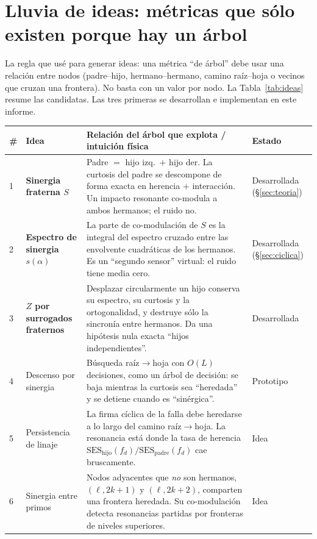 \documentclass[11pt,a4paper]{article}
\theoremstyle{definition}
\theoremstyle{remark}
\begin{document}
\section{Lluvia de ideas: métricas que sólo existen porque hay un árbol}
La regla que usé para generar ideas: una métrica ``de árbol'' debe usar una relación entre nodos (padre--hijo, hermano--hermano, camino raíz--hoja o vecinos que cruzan una frontera). No basta con un valor por nodo. La Tabla~\ref{tab:ideas} resume las candidatas. Las tres primeras se desarrollan e implementan en este informe.

\begin{table}[!htb]
\centering\small
\begin{tabularx}{\textwidth}{@{}p{0.3cm}p{3.6cm}Xp{2.1cm}@{}}
\toprule
\# & Idea & Relación del árbol que explota / intuición física & Estado \\
\midrule
1 & \textbf{Sinergia fraterna $S$} & Padre $=$ hijo izq.\ $+$ hijo der. La curtosis del padre se descompone de forma exacta en herencia $+$ interacción. Un impacto resonante co-modula a ambos hermanos; el ruido no. & Desarrollada (§\ref{sec:teoria}) \\
2 & \textbf{Espectro de sinergia $s(\alpha)$} & La parte de co-modulación de $S$ es la integral del espectro cruzado entre las envolvente cuadráticas de los hermanos. Es un ``segundo sensor'' virtual: el ruido tiene media cero. & Desarrollada (§\ref{sec:ciclica}) \\
3 & \textbf{$Z$ por surrogados fraternos} & Desplazar circularmente un hijo conserva su espectro, su curtosis y la ortogonalidad, y destruye sólo la sincronía entre hermanos. Da una hipótesis nula exacta ``hijos independientes''. & Desarrollada \\
4 & Descenso por sinergia & Búsqueda raíz$\to$hoja con $O(L)$ decisiones, como un árbol de decisión: se baja mientras la curtosis sea ``heredada'' y se detiene cuando es ``sinérgica''. & Prototipo \\
5 & Persistencia de linaje & La firma cíclica de la falla debe heredarse a lo largo del camino raíz$\to$hoja. La resonancia está donde la tasa de herencia $\mathrm{SES}_{\text{hijo}}(f_d)/\mathrm{SES}_{\text{padre}}(f_d)$ cae bruscamente. & Idea \\
6 & Sinergia entre primos & Nodos adyacentes que \emph{no} son hermanos, $(\ell,2k{+}1)$ y $(\ell,2k{+}2)$, comparten una frontera heredada. Su co-modulación detecta resonancias partidas por fronteras de niveles superiores. & Idea \\

\end{tabularx}
\end{table}
\end{document}
